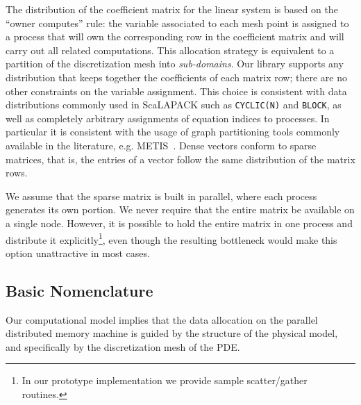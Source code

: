 The distribution of the coefficient matrix for the linear system is
based on the ``owner computes'' rule: 
the variable associated to each mesh point is assigned to a process
that will  own the corresponding row in the coefficient matrix and
will  carry out all related computations. This allocation strategy 
is equivalent to a partition of the discretization mesh into {\em
sub-domains}. 
Our library  supports any distribution that keeps together 
the coefficients of each matrix row; there are no other constraints on
the variable assignment. 
This choice is consistent with  data distributions commonly used in
ScaLAPACK  such as  \verb|CYCLIC(N)| and \verb|BLOCK|, 
as well as completely arbitrary assignments of
equation indices to processes. In particular it is consistent with the
usage of graph partitioning tools commonly available in the
literature, e.g. METIS~\cite{METIS}.
Dense vectors  conform  to sparse
matrices, that is, the entries of a vector follow the same distribution
of the matrix rows.  

We assume that the sparse matrix is built in parallel, where each
process generates its own portion. We never require that the entire
matrix be available on a single node. However, it is possible
to hold the entire matrix in one process and distribute it
explicitly\footnote{In our prototype implementation  we provide 
sample scatter/gather routines.}, even though  the resulting 
bottleneck would make this option unattractive in most  cases. 


\subsection{Basic Nomenclature}


Our computational model implies that the data allocation on the
parallel distributed memory machine is guided by the structure of the
physical model, and specifically by the discretization mesh of the
PDE. 


